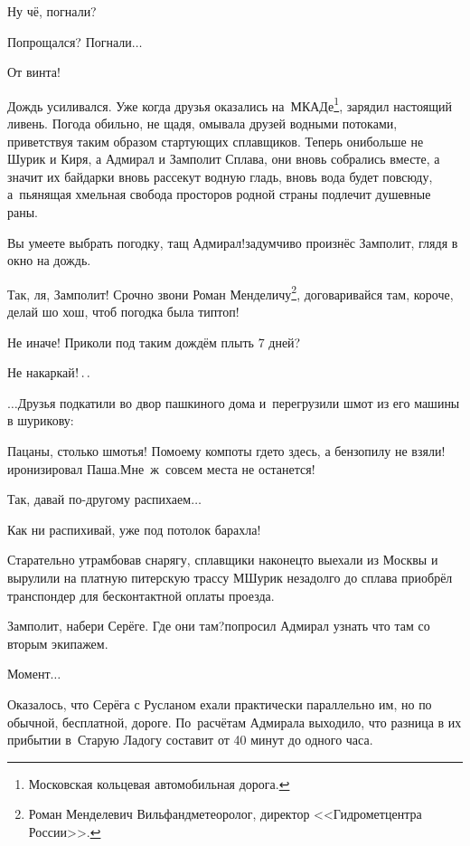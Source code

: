 \diagdash Ну чё, погнали?

\diagdash Попрощался? Погнали$\ldots$

\diagdash От винта!

\renewcommand*{\thefootnote}{\arabic{footnote}}

Дождь усиливался. Уже когда друзья оказались на~МКАДе\footnote{Московская кольцевая автомобильная дорога.}, зарядил настоящий ливень. Погода обильно, не щадя, омывала друзей водными потоками, приветствуя таким образом стартующих сплавщиков. Теперь они\mdash больше не Шурик и Киря, а Адмирал и Замполит Сплава, они вновь собрались вместе, а значит их байдарки вновь рассекут водную гладь, вновь вода будет повсюду, а~пьянящая хмельная свобода просторов родной страны подлечит душевные раны.

\diagdash Вы умеете выбрать погодку, тащ Адмирал!\mdash задумчиво произнёс Замполит, глядя в окно на дождь.

\diagdash Так, ля, Замполит! Срочно звони Роман Менделичу\footnote{Роман Менделевич Вильфанд\mdash метеоролог, директор <<Гидрометцентра России>>.}, договаривайся там, короче, делай шо хош, чтоб погодка была тип\sdash топ!

\diagdash Не иначе! Приколи под таким дождём плыть 7 дней?

\diagdash Не накаркай$\exldots$

\vspace{0.5cm}
$\ldots$Друзья подкатили во двор пашкиного дома и~перегрузили шмот из его машины в шурикову:

\diagdash Пацаны, столько шмотья! По\sdash моему компоты где\sdash то здесь, а бензопилу не взяли!\mdash иронизировал Паша.\mdash Мне~ж~совсем места не останется!

\diagdash Так, давай по-другому распихаем$\ldots$

\diagdash Как ни распихивай, уже под потолок барахла!

Старательно утрамбовав снарягу, сплавщики наконец\sdash то выехали из Москвы и вырулили на платную питерскую трассу М\mdash Шурик незадолго до сплава приобрёл транспондер для бесконтактной оплаты проезда.

\diagdash Замполит, набери Серёге. Где они там?\mdash попросил Адмирал узнать что там со вторым экипажем.

\diagdash Момент$\ldots$

Оказалось, что Серёга с Русланом ехали практически параллельно им, но по обычной, бесплатной, дороге. По~расчётам Адмирала выходило, что разница в их прибытии в~Старую Ладогу составит от 40 минут до одного часа.

